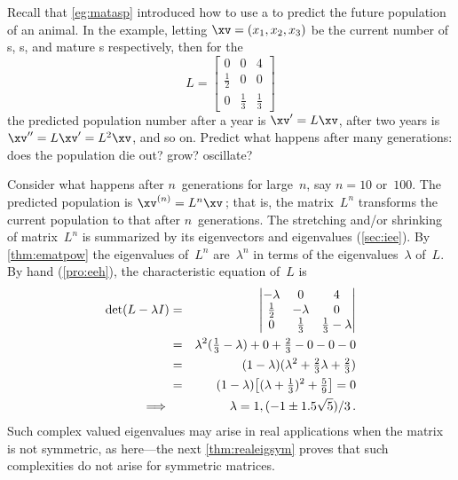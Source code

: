 \begin{example} \label{eg:ltas}
Recall that \cref{eg:matasp} introduced how to use a  to predict the future population of an animal.
In the example, letting \(\xv=(x_1,x_2,x_3)\) be the current number of s, s, and mature s respectively, then for the 
\begin{equation*}
L=\begin{bmatrix} 0&0&4\\\frac12&0&0\\0&\frac13&\frac13 \end{bmatrix}
\end{equation*} 
the predicted population number after a year is \(\xv'=L\xv\), after two years is \(\xv''=L\xv'=L^2\xv\), and so on.
Predict what happens after many generations: does the population die out? grow? oscillate? 
\begin{solution} 
Consider what happens after \(n\)~generations for large~\(n\), say \(n=10\) or~\(100\).
The predicted population is \(\xv^{(n)}=L^n\xv\)\,; that is, the matrix~\(L^n\) transforms the current population to that after \(n\)~generations.
The stretching and/or shrinking of matrix~\(L^n\) is summarized by its eigenvectors and eigenvalues (\cref{sec:iee}).
By \cref{thm:ematpow} the eigenvalues of~\(L^n\) are~\(\lambda^n\) in terms of the eigenvalues~\(\lambda\) of~\(L\).
By hand (\cref{pro:eeh}), the characteristic equation of~\(L\) is
\begin{eqnarray*}
\det(L-\lambda I)
&=&\begin{vmatrix} -\lambda&0&4\\\frac12&-\lambda&0\\0&\frac13&\frac13-\lambda \end{vmatrix}
\\&=&\lambda^2(\tfrac13-\lambda)+0+\tfrac23-0-0-0
\\&=&(1-\lambda)(\lambda^2 +\tfrac23\lambda+\tfrac23)
\\&=&(1-\lambda)\big[(\lambda+\tfrac13)^2+\tfrac59\big]=0
\\\implies&&\lambda=1,(-1\pm 1.5\sqrt5)/3\,.
\end{eqnarray*}
Such complex valued eigenvalues may arise in real applications when the matrix is not symmetric, as here---the next \cref{thm:realeigsym} proves that such complexities do not arise for symmetric matrices.


\end{solution}
\end{example}
